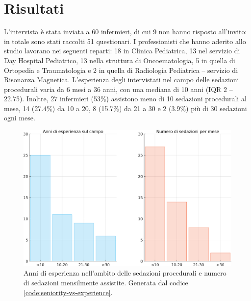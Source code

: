 \chapter{Risultati}

L'intervista è stata inviata a 60 infermieri, di cui 9 non hanno risposto all'invito: in totale sono stati raccolti 51 questionari. I professionisti che hanno aderito allo studio lavorano nei seguenti reparti: 18 in Clinica Pediatrica, 13 nel servizio di Day Hospital Pediatrico, 13 nella struttura di Oncoematologia, 5 in quella di Ortopedia e Traumatologia e 2 in quella di Radiologia Pediatrica -- servizio di Risonanza Magnetica. L'esperienza degli intervistati nel campo delle sedazioni procedurali varia da 6 mesi a 36 anni, con una mediana di 10 anni (IQR 2 -- 22.75). Inoltre, 27 infermieri (53$\%$) assistono meno di 10 sedazioni procedurali al mese, 14 (27.4$\%$) da 10 a 20, 8 (15.7$\%$) da 21 a 30 e 2 (3.9$\%$) più di 30 sedazioni ogni mese. 

\vfill

\begin{figure}[!ht]
    \centering
    \includegraphics[width=1\textwidth]{Figure/esperienzaVSfrequenza.png}
    \caption{Anni di esperienza nell'ambito delle sedazioni procedurali e numero di sedazioni mensilmente assistite. Generata dal codice \ref{code:seniority-vs-experience}.}
    \label{fig:esperienzavsfrequenza}
\end{figure}

\vfill

\newpage

